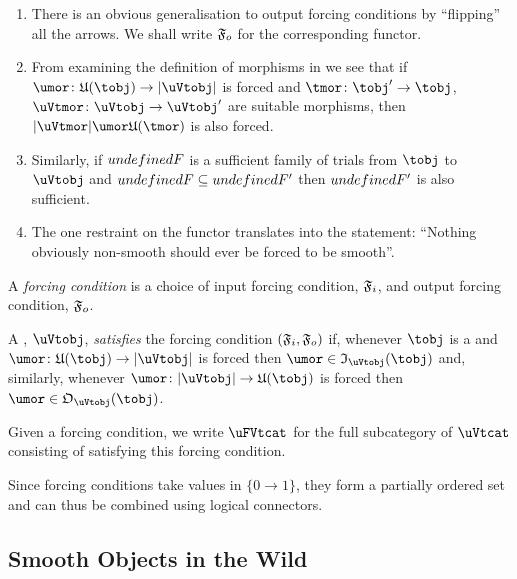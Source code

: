 \documentclass[%
a4paper,%
arxiv,%
defaults
]{myclass}
\begin{document}
\begin{remark}
\begin{enumerate}
\item There is an obvious generalisation to output forcing conditions by ``flipping'' all the arrows.
We shall write \(\oforce\) for the corresponding functor.

\item From examining the definition of morphisms in \rcat we see that if \(\umor \colon \ufunc(\tobj) \to \abs{\uVtobj}\) is forced and \(\tmor \colon \tobj' \to \tobj\), \(\uVtmor \colon \uVtobj \to \uVtobj'\) are suitable morphisms, then \(\abs{\uVtmor} \umor \ufunc(\tmor)\) is also forced.

\item Similarly, if \(\m{F}\) is a sufficient family of trials from \(\tobj\) to \(\uVtobj\) and \(\m{F} \subseteq \m{F}'\) then \(\m{F}'\) is also sufficient.

\item The one restraint on the functor translates into the statement: ``Nothing obviously non\hyp{}smooth should ever be forced to be smooth''.
\end{enumerate}
\end{remark}

\begin{defn}
A \emph{forcing condition} is a choice of input forcing condition, \(\iforce\), and output forcing condition, \(\oforce\).

A \uVtobj, \(\uVtobj\), \emph{satisfies} the forcing condition \((\iforce, \oforce)\) if, whenever \(\tobj\) is a \tobj and \(\umor \colon \ufunc(\tobj) \to \abs{\uVtobj}\) is forced then \(\umor \in \itest_{\uVtobj}(\tobj)\) and, similarly, whenever \(\umor \colon \abs{\uVtobj} \to \ufunc(\tobj)\) is forced then \(\umor \in \otest_{\uVtobj}(\tobj)\).

Given a forcing condition, we write \(\uFVtcat\) for the full subcategory of \(\uVtcat\) consisting of \uVtobjs satisfying this forcing condition.
\end{defn}

Since forcing conditions take values in \(\{0 \to 1\}\), they form a partially ordered set and can thus be combined using logical connectors.


\subsection{Smooth Objects in the Wild}
\label{sec:smthwild}
\end{document}
